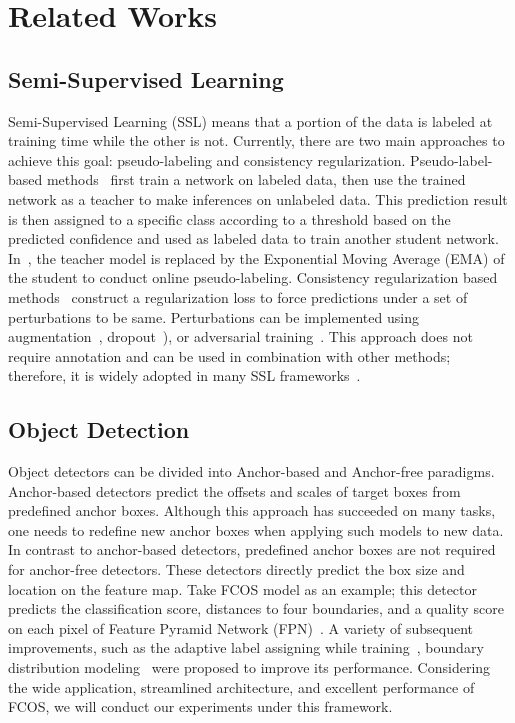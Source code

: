 \documentclass[runningheads]{llncs}
\begin{document}
\section{Related Works}
\subsection{Semi-Supervised Learning}
Semi-Supervised Learning (SSL) means that a portion of the data is labeled at training time while the other is not. 
Currently, there are two main approaches to achieve this goal: pseudo-labeling and consistency regularization. Pseudo-label-based methods~\cite{pseudolabel} first train a network on labeled data, then use the trained network as a teacher to make inferences on unlabeled data. This prediction result is then assigned to a specific class according to a threshold based on the predicted confidence and used as labeled data to train another student network. In~\cite{mean_teacher}, the teacher model is replaced by the Exponential Moving Average (EMA) of the student to conduct online pseudo-labeling. 
Consistency regularization based methods~\cite{consistencyreg} construct a regularization loss to force predictions under a set of perturbations  to be same. Perturbations can be implemented using augmentation~\cite{simclr,perturbreg,noisystudent}, dropout~\cite{temporalensemble}), or adversarial training~\cite{adversarial}. This approach does not require annotation and can be used in combination with other methods; therefore, it is widely adopted in many SSL frameworks~\cite{pseudoensemble,fixmatch,mixmatch}.

\subsection{Object Detection}
Object detectors can be divided into Anchor-based and Anchor-free paradigms. Anchor-based detectors predict the offsets and scales of target boxes from predefined anchor boxes. Although this approach has succeeded on many tasks, one needs to redefine new anchor boxes when applying such models to new data. 
In contrast to anchor-based detectors, predefined anchor boxes are not required for anchor-free detectors. These detectors directly predict the box size and location on the feature map. Take FCOS model as an example; this detector predicts the classification score, distances to four boundaries, and a quality score on each pixel of Feature Pyramid Network (FPN)~\cite{fpn}. A variety of subsequent improvements, such as the adaptive label assigning while training~\cite{atss}, boundary distribution modeling~\cite{gflv1} were proposed to improve its performance. Considering the wide application, streamlined architecture, and excellent performance of FCOS, we will conduct our experiments under this framework.
\end{document}

